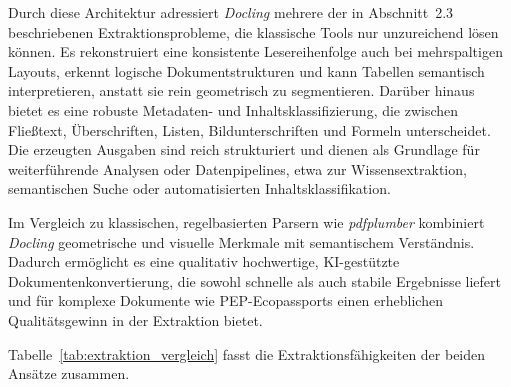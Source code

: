 Durch diese Architektur adressiert \emph{Docling} mehrere der in Abschnitt~2.3 beschriebenen Extraktionsprobleme, die klassische Tools nur unzureichend lösen können. 
Es rekonstruiert eine konsistente Lesereihenfolge auch bei mehrspaltigen Layouts, erkennt logische Dokumentstrukturen und kann Tabellen semantisch 
interpretieren, anstatt sie rein geometrisch zu segmentieren.  \cite{Auer2025}
Darüber hinaus bietet es eine robuste Metadaten- und Inhaltsklassifizierung, die zwischen Fließtext, Überschriften, Listen, 
Bildunterschriften und Formeln unterscheidet. 
Die erzeugten Ausgaben sind reich strukturiert und dienen als Grundlage für weiterführende Analysen oder Datenpipelines, etwa zur Wissensextraktion, 
semantischen Suche oder automatisierten Inhaltsklassifikation. \cite{Auer2024}

Im Vergleich zu klassischen, regelbasierten Parsern wie \emph{pdfplumber} kombiniert \emph{Docling} geometrische und visuelle Merkmale mit semantischem Verständnis. 
Dadurch ermöglicht es eine qualitativ hochwertige, KI-gestützte Dokumentenkonvertierung, die sowohl schnelle 
als auch stabile Ergebnisse liefert und für komplexe Dokumente wie PEP-Ecopassports einen erheblichen Qualitätsgewinn in der Extraktion bietet. \cite{Auer2024}

Tabelle~\ref{tab:extraktion_vergleich} fasst die Extraktionsfähigkeiten der beiden Ansätze zusammen. 

